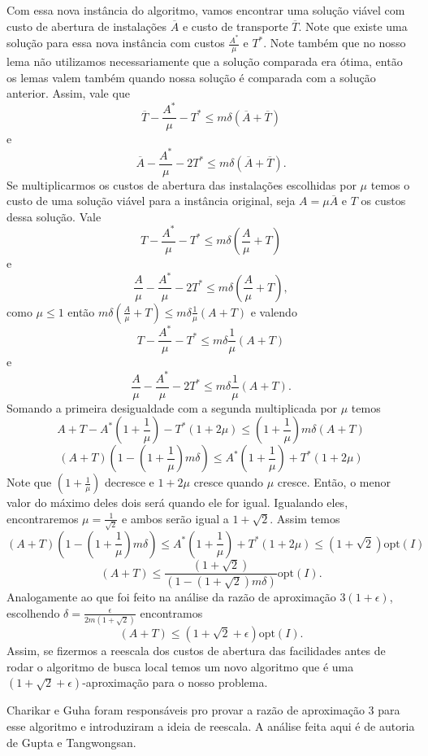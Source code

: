 \documentclass[12pt]{article}
\newcommand{\opt}{\ensuremath{\mathrm{opt}}}
\begin{document}
Com essa nova instância do algoritmo, vamos encontrar uma solução viável com custo de abertura de instalações $\overline{A}$ e custo de transporte $\overline{T}$. Note que existe uma solução para essa nova instância com custos $\frac{A^*}{\mu}$ e $T^*$. Note também que no nosso lema não utilizamos necessariamente que a solução comparada era ótima, então os lemas valem também quando nossa solução é comparada com a solução anterior. Assim, vale que
\[ \overline{T} - \frac{A^*}{\mu} - T^* \leq m\delta(\overline{A} + \overline{T})\]
e
\[ \overline{A} - \frac{A^*}{\mu} - 2T^* \leq m\delta(\overline{A} + \overline{T}).\]
Se multiplicarmos os custos de abertura das instalações escolhidas por $\mu$ temos o custo de uma solução viável para a instância original, seja $A = \mu\overline{A}$ e $T$ os custos dessa solução. Vale
\[ T - \frac{A^*}{\mu} - T^* \leq m\delta(\frac{A}{\mu}+ T)\]
e
\[ \frac{A}{\mu} - \frac{A^*}{\mu} - 2T^* \leq m\delta(\frac{A}{\mu} + T),\]
como $\mu \leq 1$ então $m\delta(\frac{A}{\mu}+ T) \leq m\delta\frac{1}{\mu}( A + T)$ e valendo 
\[T - \frac{A^*}{\mu} - T^* \leq m\delta\frac{1}{\mu}( A + T) \] 
e 
\[ \frac{A}{\mu} - \frac{A^*}{\mu} - 2T^* \leq m\delta\frac{1}{\mu}( A + T) .\]
Somando a primeira desigualdade com a segunda multiplicada por $\mu$ temos
\[A + T - A^* (1 + \frac{1}{\mu}) - T^*(1 + 2\mu) \leq (1 + \frac{1}{\mu})m\delta(A+T)\]
\[(A+T)(1 - (1+\frac{1}{\mu})m\delta)\leq A^* (1 + \frac{1}{\mu}) + T^*(1 + 2\mu)\]
Note que $(1+\frac{1}{\mu})$ decresce e $1 + 2\mu$ cresce quando $\mu$ cresce. Então, o menor valor do máximo deles dois será quando ele for igual. Igualando eles, encontraremos $\mu = \frac{1}{\sqrt{2}}$ e ambos serão igual a $1 + \sqrt{2}$. Assim temos
\[(A+T)(1 - (1+\frac{1}{\mu})m\delta)\leq A^* (1 + \frac{1}{\mu}) + T^*(1 + 2\mu) \leq (1+\sqrt{2})\opt(I)\]
\[(A+T)\leq \frac{(1+\sqrt{2})}{(1 - (1+\sqrt{2 })m\delta)}\opt(I).\]
Analogamente ao que foi feito na análise da razão de aproximação $3(1 + \epsilon)$, escolhendo $\delta = \frac{\epsilon}{2m(1+\sqrt{2})}$ encontramos 
\[(A+T) \leq (1 + \sqrt{2} + \epsilon )\opt(I).\]
Assim, se fizermos a reescala dos custos de abertura das facilidades antes de rodar o algoritmo de busca local temos um novo algoritmo que é uma $(1 + \sqrt{2} + \epsilon )$-aproximação para o nosso problema.

Charikar e Guha foram responsáveis pro provar a razão de aproximação 3 para esse algoritmo e introduziram a ideia de reescala. A análise feita aqui é de autoria de Gupta e Tangwongsan. 
\newpage


\end{document}
